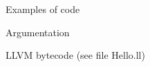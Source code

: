 %
\begin{Frame}{Examples of code}
      \begin{block}{Argumentation}
        
      \end{block} 
      \begin{block}{LLVM bytecode (see file Hello.ll)}
        
      \end{block}   
\end{Frame}


